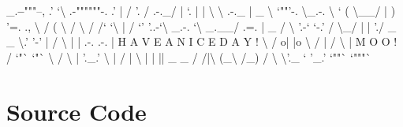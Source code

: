 \documentclass[]{article}
\newenvironment{Shaded}{\begin{snugshade}}{\end{snugshade}}
\newcommand{\DataTypeTok}[1]{\textcolor[rgb]{0.13,0.29,0.53}{#1}}
\newcommand{\CharTok}[1]{\textcolor[rgb]{0.31,0.60,0.02}{#1}}
\newcommand{\StringTok}[1]{\textcolor[rgb]{0.31,0.60,0.02}{#1}}
\newcommand{\OperatorTok}[1]{\textcolor[rgb]{0.81,0.36,0.00}{\textbf{#1}}}
\newcommand{\NormalTok}[1]{#1}
\begin{document}
\begin{Shaded}
\begin{Highlighting}[]
\NormalTok{                                      _.}\OperatorTok{--}\StringTok{"""--,}
\StringTok{                                    .'          `\textbackslash{}}
\StringTok{  .-""""""-.                      .'              |}
\StringTok{ /          '.                   /            .-._/}
\StringTok{|             `.                |             |}
\StringTok{ \textbackslash{}              \textbackslash{}          .-._ |          _   \textbackslash{}}
\StringTok{  `""'-.         \textbackslash{}_.-.     \textbackslash{}   `          ( \textbackslash{}__/}
\StringTok{        |             )     '=.       .,   \textbackslash{}  }
\StringTok{       /             (         \textbackslash{}     /  \textbackslash{}  /}
\StringTok{     /`               `\textbackslash{}        |   /    `'}
\StringTok{     '..-`\textbackslash{}        _.-. `\textbackslash{} _.__/   .=.}
\StringTok{          |  _    / \textbackslash{}  '.-`    `-.'  /}
\StringTok{          \textbackslash{}_/ |  |   './ _     _  \textbackslash{}.'}
\StringTok{               '-'    | /       \textbackslash{} |  }
\StringTok{                      |  .-. .-.  |   H A V E   A   N I C E   D A Y !}
\StringTok{                      \textbackslash{} / o| |o \textbackslash{} /}
\StringTok{                       |   / \textbackslash{}   |           M O O !}
\StringTok{                      / `"`}\DataTypeTok{   }\StringTok{`"` \textbackslash{}}
\StringTok{                     /             \textbackslash{}}
\StringTok{                    | '._.'         \textbackslash{}}
\StringTok{                    |  /             |}
\StringTok{                     \textbackslash{} |             |}
\StringTok{                      ||    _    _   /}
\StringTok{                      /|\textbackslash{}  (_\textbackslash{}  /_) /}
\StringTok{                      \textbackslash{} }\CharTok{\textbackslash{}'}\StringTok{._  ` '_.'}
\StringTok{                       `""` `"""`}
\end{Highlighting}
\end{Shaded}

\section{Source Code}\label{source-code}
\end{document}
